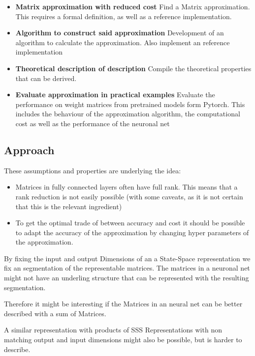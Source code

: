 \documentclass[lang=ngerman,inputenc=utf8,fontsize=10pt]{ldvarticle}
\begin{document}
\begin{itemize}

	\item\textbf{Matrix approximation with reduced cost} Find a Matrix approximation. This requires a formal definition, as well as a reference implementation.
	\item\textbf{Algorithm to construct said approximation} Development of an algorithm to calculate the approximation. Also implement an reference implementation
	\item\textbf{Theoretical description of description} Compile the theoretical properties that can be derived.
	\item\textbf{Evaluate approximation in practical examples} Evaluate the performance on weight matrices from pretrained models form Pytorch. This includes the behaviour of the approximation algorithm, the computational cost as well as the performance of the neuronal net
\end{itemize}





\subsection*{Approach}

These assumptions and properties are underlying the idea:
\begin{itemize}
	\item Matrices in fully connected layers often have full rank. This means that a rank reduction is not easily possible (with some caveats, as it is not certain that this is the relevant ingredient) \cite{martin_implicit_2018}
	\item To get the optimal trade of between accuracy and cost it should be possible to adapt the accuracy of the approximation by changing hyper parameters of the approximation.
\end{itemize}

By fixing the input and output Dimensions of an a State-Space representation we fix an segmentation of the representable matrices.
The matrices in a neuronal net might not have an underling structure that can be represented with the resulting segmentation.

Therefore it might be interesting if the Matrices in an neural net can be better described with a sum of Matrices.

A similar representation with products of SSS Representations with non matching output and input dimensions might also be possible, but is harder to describe.
\end{document}
